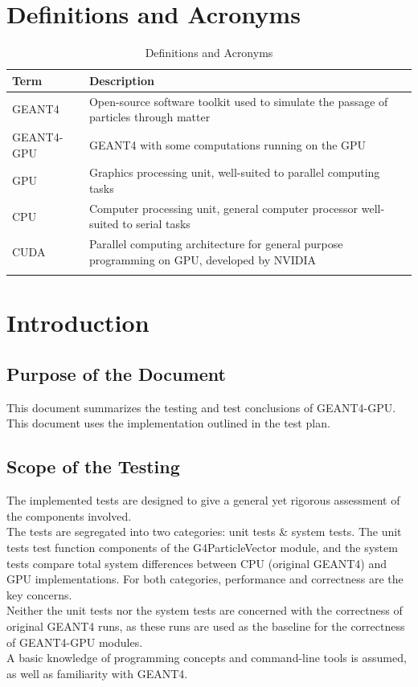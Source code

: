 \documentclass[12pt]{article}
\begin{document}
\section*{Definitions and Acronyms} %
\begin{table}[h]
\centering
\caption{Definitions and Acronyms}\label{Table_DefAndAcro}
\begin{tabularx}{\textwidth}{lX}
\toprule
\bf Term & \bf Description\\\midrule
GEANT4 & Open-source software toolkit used to simulate the passage of particles through matter\\
GEANT4-GPU & GEANT4 with some computations running on the GPU\\
GPU & Graphics processing unit, well-suited to parallel computing tasks\\
CPU & Computer processing unit, general computer processor well-suited to serial tasks\\
CUDA & Parallel computing architecture for general purpose programming on GPU, developed by NVIDIA\\
\Xhline{2\arrayrulewidth}
\end{tabularx}
\end{table}


\section{Introduction}
\subsection{Purpose of the Document}
This document summarizes the testing and test conclusions of GEANT4-GPU. This document uses the implementation outlined in the test plan.
\subsection{Scope of the Testing}
The implemented tests are designed to give a general yet rigorous assessment of the components involved.\\
The tests are segregated into two categories: unit tests \& system tests.
The unit tests test function components of the G4ParticleVector module, and the system tests compare total system differences between CPU (original GEANT4) and GPU implementations. For both categories, performance and correctness are the key concerns.\\
Neither the unit tests nor the system tests are concerned with the correctness of original GEANT4 runs, as these runs are used as the baseline for the correctness of GEANT4-GPU modules.\\
A basic knowledge of programming concepts and command-line tools is assumed, as well as familiarity with GEANT4. 
\end{document}
